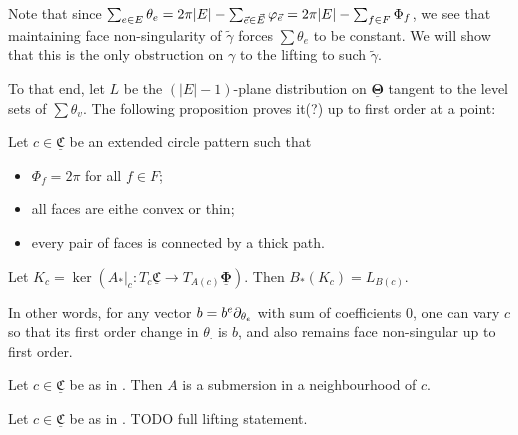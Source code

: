 \documentclass{amsart}
\newcommand{\CCC}{{\underline{\mathfrak{C}}}}
\newcommand{\PPP}{{\underline{\mathbf{\Phi}}}}
\newcommand{\TTT}{{\underline{\mathbf{\Theta}}}}
\begin{document}
Note that since $\sum_{e\in E} \theta_e
= 2\pi |E| - \sum_{\vec{e} \in \vec{E}} \varphi_{\vec{e}}
= 2\pi |E| - \sum_{f\in F} \Phi_f$,
we see that maintaining face non-singularity of $\tilde{\gamma}$
forces $\sum \theta_e$ to be constant.
We will show that this is the only obstruction on $\gamma$
to the lifting to such $\tilde{\gamma}$.

To that end, let $L$ be the $(|E|-1)$-plane distribution on $\TTT$
tangent to the level sets of $\sum \theta_v$.
The following proposition proves it(?) up to first order at a point:


\begin{proposition}
\label{p:point_lift}
Let $c \in \CCC$ be an extended circle pattern such that
\begin{itemize}
	\item $\Phi_f = 2\pi$ for all $f\in F$;
	\item all faces are eithe convex or thin;
	\item every pair of faces is connected by a thick path.
\end{itemize}
Let $K_c = \ker (A_*|_c : T_c \CCC \to T_{A(c)} \PPP)$.
Then $B_*(K_c) = L_{B(c)}$.

In other words, for any vector $b = b^e \partial_{\theta_e}$
with sum of coefficients 0, one can vary $c$ so that its
first order change in $\theta_\cdot$ is $b$,
and also remains face non-singular up to first order.
\end{proposition}


\begin{lemma}
Let $c \in \CCC$ be as in .
Then $A$ is a submersion in a neighbourhood of $c$.
\end{lemma}

\begin{proposition}
Let $c\in \CCC$ be as in .
TODO full lifting statement.
\end{proposition}


%
\end{document}
